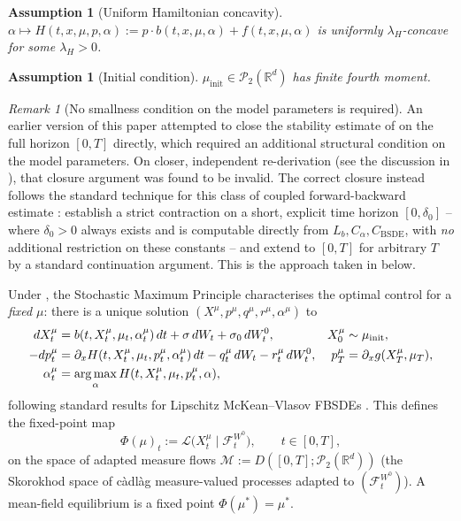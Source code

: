 \documentclass[11pt]{article}
\newtheorem{assumption}[theorem]{Assumption}
\theoremstyle{remark}
\newtheorem{remark}[theorem]{Remark}
\DeclareMathOperator*{\argmax}{arg\,max}
\begin{document}
\begin{assumption}[Uniform Hamiltonian concavity]
\label{ass:concavity}
$\alpha \mapsto H(t,x,\mu,p,\alpha) := p\cdot b(t,x,\mu,\alpha) + f(t,x,\mu,\alpha)$
is uniformly $\lambda_H$-concave for some $\lambda_H > 0$.
\end{assumption}

\begin{assumption}[Initial condition]
\label{ass:initial}
$\mu_{\mathrm{init}} \in \mathcal{P}_2(\mathbb{R}^d)$ has finite fourth moment.
\end{assumption}

\begin{remark}[No smallness condition on the model parameters is required]
\label{rem:no-smallness}
An earlier version of this paper attempted to close the stability estimate of
 on the full horizon $[0,T]$ directly, which required an
additional structural condition on the model parameters. On closer, independent
re-derivation (see the discussion in ), that closure argument
was found to be invalid. The correct closure instead follows the standard
technique for this class of coupled forward-backward estimate
\citep{ahuja2016,peng1999,qiao2025}: establish a strict contraction on a
short, explicit time horizon $[0,\delta_0]$ -- where $\delta_0 > 0$ always
exists and is computable directly from $L_b, C_\alpha, C_{\mathrm{BSDE}}$, with
\emph{no} additional restriction on these constants -- and extend to $[0,T]$ for
arbitrary $T$ by a standard continuation argument. This is the approach taken in
 below.
\end{remark}

Under ,
the Stochastic Maximum Principle characterises the optimal control for a \emph{fixed}
$\mu$: there is a unique solution $(X^\mu, p^\mu, q^\mu, r^\mu, \alpha^\mu)$ to
\begin{align}
    dX_t^\mu &= b(t, X_t^\mu, \mu_t, \alpha_t^\mu)\, dt + \sigma\, dW_t + \sigma_0\,
        dW_t^0, & X_0^\mu &\sim \mu_{\mathrm{init}}, \notag \\
    -dp_t^\mu &= \partial_x H(t, X_t^\mu, \mu_t, p_t^\mu, \alpha_t^\mu)\, dt -
        q_t^\mu\, dW_t - r_t^\mu\, dW_t^0, & p_T^\mu &= \partial_x g(X_T^\mu, \mu_T),
        \label{eq:agent-fbsde} \\
    \alpha_t^\mu &= \argmax_{\alpha} H(t, X_t^\mu, \mu_t, p_t^\mu, \alpha), \notag
\end{align}
following standard results for Lipschitz McKean--Vlasov FBSDEs
\citep[Vol.~I, Ch.~4]{carmonadelarue2018}. This defines the fixed-point map
\begin{equation}
    \Phi(\mu)_t := \mathcal{L}\big(X_t^\mu \mid \mathcal{F}_t^{W^0}\big), \qquad
    t \in [0,T],
    \label{eq:fixed-point-map}
\end{equation}
on the space of adapted measure flows $\mathcal{M} := D([0,T]; \mathcal{P}_2(\mathbb{R}^d))$
(the Skorokhod space of c\`adl\`ag measure-valued processes adapted to
$(\mathcal{F}_t^{W^0})$). A mean-field equilibrium is a fixed point $\Phi(\mu^*) = \mu^*$.
\end{document}
